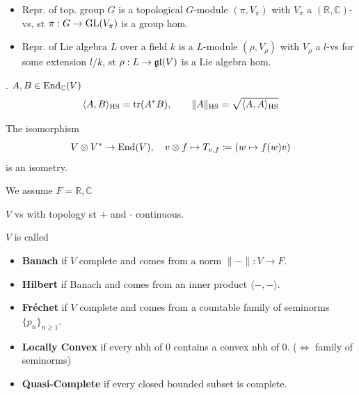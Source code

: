 \begin{definition}
\begin{itemize}[topsep=-6pt, itemsep=0pt]
    \item Repr. of top. group $G$ is a topological $G$-module $( \pi , V_{\pi })$ with $V_\pi $ a $(\mathbb{R}, \mathbb{C})$-vs, st $\pi : G \to \operatorname{GL}(V_\pi)$ is a group hom.
    \item Repr. of Lie algebra $L$ over a field $k$ is a $L$-module $(\rho, V_\rho)$ with $V_\rho$ a $l$-vs for some extension $l / k$, st $\rho : L \to \operatorname{\mathfrak{g}\mathfrak{l}} (V)$ is a Lie algebra hom.
\end{itemize}
\end{definition}

\begin{definition}. $A, B \in \operatorname{End}_{\mathbb{C}}(V)$
\[
\langle A, B \rangle_{\text{HS}} = \operatorname{tr}(A^* B), \qquad \|A\|_{\text{HS}} = \sqrt{\langle A, A \rangle_{\text{HS}}}
\]
\end{definition}

\begin{proposition}
The isomorphism 
\[
V \otimes V^* \to \operatorname{End}(V), \quad v \otimes f \mapsto T_{v, f} \coloneqq (w \mapsto f(w) v)
\]
is an isometry.
\end{proposition}

We assume $F = \mathbb{R}, \mathbb{C}$ 
\begin{definition}[Top. vs] $V$ vs with topology st $+$ and $\cdot$ continuous.
\end{definition}

\begin{definition} $V$ is called
\begin{itemize}[topsep=-6pt, itemsep=0pt]
    \item \textbf{Banach} if $V$ complete and comes from a norm $\|-\|: V \to F$.
    \item \textbf{Hilbert} if Banach and comes from an inner product $\langle - , - \rangle$.
    \item \textbf{Fréchet} if $V$ complete and comes from a countable family of seminorms $\{p_n\}_{n \geq 1}$.
    \item \textbf{Locally Convex} if every nbh of $0$ contains a convex nbh of $0$. ($ \iff $ family of seminorms)
    \item \textbf{Quasi-Complete} if every closed bounded subset is complete.
\end{itemize}
\end{definition}

